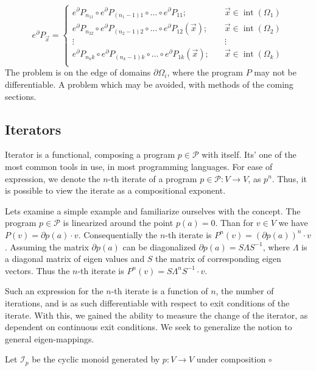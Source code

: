 \documentclass{article}
\newcommand{\dP}{\mathcal{P}}
\newcommand{\D}{\partial}
\DeclareMathOperator{\interior}{int}
\begin{document}
 \begin{equation}
   \label{eq:Dzlrprk_splosno}
   e^\D P_{\vec{x}} =
   \begin{cases}
     e^\D P_{n_11}\circ e^\D P_{(n_1-1)1}\circ\ldots\circ e^\D P_{11};&\quad \vec{x}\in\interior(\Omega_1)\\
     e^\D P_{n_22}\circ e^\D P_{(n_2-1)2}\circ\ldots\circ e^\D P_{12}(\vec{x});&\quad \vec{x}\in\interior(\Omega_2)\\
     \vdots&\quad\vdots\\
     e^\D P_{n_kk}\circ e^\D P_{(n_k-1)k}\circ\ldots\circ e^\D P_{1k}(\vec{x});&\quad \vec{x}\in\interior(\Omega_k)\\
   \end{cases}
 \end{equation}
 The problem is on the edge of domains $\partial\Omega_i$, where the program $P$ may not be differentiable. A problem which may be avoided, with methods of the coming sections.
 
  \subsection{Iterators}
  
  Iterator is a functional, composing a program $p\in\dP$ with itself. Its' one of the most common tools in use, in most programming languages. For ease of expression, we denote the $n$-th iterate of a program $p\in\dP:V\to V$, as $p^n$. Thus, it is possible to view the iterate as a compositional exponent.
  
  Lets examine a simple example and familiarize ourselves with the concept. The program $p\in\dP$ is linearized around the point $p(a)=0$. Than for $v\in V$ we have $P(v)=\D p(a)\cdot v$. Consequentially the $n$-th iterate is $P^n(v)=(\D p(a))^n\cdot v$. Assuming the matrix $\D p(a)$ can be diagonalized $\D p(a)=S\Lambda S^{-1}$, where $\Lambda$ is a diagonal matrix of eigen values and $S$ the matrix of corresponding eigen vectors. Thus the $n$-th iterate is $P^n(v)=S\Lambda^nS^{-1}\cdot v$.
  
  Such an expression for the $n$-th iterate is a function of $n$, the number of iterations, and is as such differentiable with respect to exit conditions of the iterate. With this, we gained the ability to measure the change of the iterator, as dependent on continuous exit conditions. We seek to generalize the notion to general eigen-mappings.
  
  Let $\mathcal{I}_p$ be the cyclic monoid generated by $p:V\to V$ under composition $\circ$
  
\end{document}
